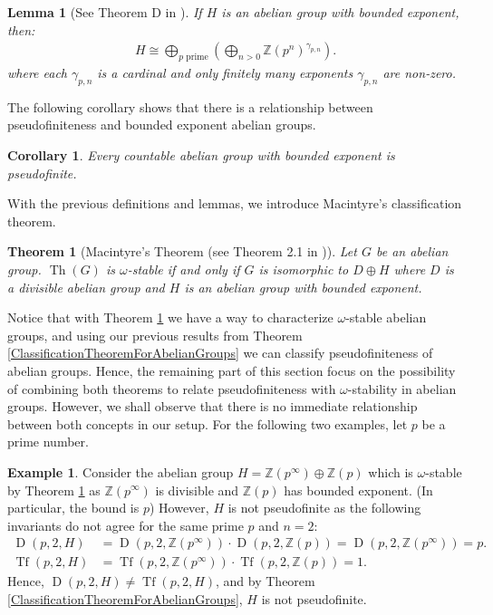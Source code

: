 \documentclass[10pt,a4paper]{amsart}
\newtheorem{lema}[prop]{Lemma}
\newtheorem{teor}[prop]{Theorem}
\newtheorem{corol}[prop]{Corollary}
\theoremstyle{definition}
\newtheorem{ejem}[prop]{Example}
\newcommand{\bej}{\begin{ejem}}
\newcommand{\eej}{\end{ejem}}
\newcommand{\bl}{\begin{lema}}
\newcommand{\el}{\end{lema}}
\newcommand{\bc}{\begin{corol}}
\newcommand{\ec}{\end{corol}}
\newcommand{\bt}{\begin{teor}}
\newcommand{\et}{\end{teor}}
\begin{document}
\bl[See Theorem D in \cite{Macintyre1971}] If $H$ is an abelian group with bounded exponent, then:
\begin{align*}
    H \cong \bigoplus\limits_{p \text{ prime}}\left(\bigoplus\limits_{n>0} \mathbb{Z}(p^{n})^{\gamma_{p,n}}\right).
\end{align*}
where each $\gamma_{p,n}$ is a cardinal and only finitely many exponents $\gamma_{p,n}$ are non-zero.
\label{IsomorAbelExponenteAcotado}
\el 
The following corollary shows that there is a relationship between pseudofiniteness and bounded exponent abelian groups.
\bc Every countable abelian group with bounded exponent is pseudofinite. 
\ec 
With the previous definitions and lemmas, we introduce Macintyre's classification theorem.
\bt[Macintyre's Theorem (see Theorem 2.1 in \cite{Macintyre1971})] Let $G$ be an abelian group. $\operatorname{Th}(G)$ is $\omega$-stable if and only if $G$ is isomorphic to $D\oplus H$ where $D$ is a divisible abelian group and $H$ is an abelian group with bounded exponent. 
\label{TeoremaMacintyre2.0}
\et
Notice that with Theorem \ref{TeoremaMacintyre2.0} we have a way to characterize $\omega$-stable abelian groups, and using our previous results from Theorem \ref{ClassificationTheoremForAbelianGroups} we can classify pseudofiniteness of abelian groups. Hence, the remaining part of this section focus on the possibility of combining both theorems to relate pseudofiniteness with $\omega$-stability in abelian groups. However, we shall observe that there is no immediate relationship between both concepts in our setup. For the following two examples, let $p$ be a prime number.
\bej Consider the abelian group $H=\mathbb{Z}(p^{\infty})\oplus \mathbb{Z}(p)$ which is $\omega$-stable by Theorem \ref{TeoremaMacintyre2.0} as $\mathbb{Z}(p^{\infty})$ is divisible and $\mathbb{Z}(p)$ has bounded exponent. (In particular, the bound is $p$) However, $H$ is not pseudofinite as the following invariants do not agree for the same prime $p$ and $n=2$:
\begin{align*}
    \operatorname{D}(p,2,H) &= \operatorname{D}(p,2,\mathbb{Z}(p^{\infty}))\cdot\operatorname{D}(p,2,\mathbb{Z}(p)) = \operatorname{D}(p,2,\mathbb{Z}(p^{\infty})) = p.\\
    \operatorname{Tf}(p,2,H) &= \operatorname{Tf}(p,2,\mathbb{Z}(p^{\infty}))\cdot\operatorname{Tf}(p,2,\mathbb{Z}(p)) = 1.
\end{align*}
Hence, $\operatorname{D}(p,2,H)\neq\operatorname{Tf}(p,2,H)$, and by Theorem \ref{ClassificationTheoremForAbelianGroups}, $H$ is not pseudofinite.
\eej
\end{document}
